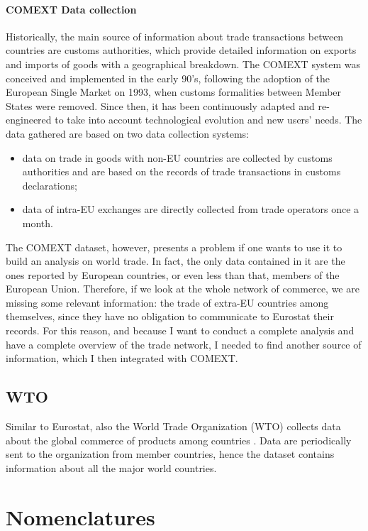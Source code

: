 \paragraph{COMEXT Data collection}
Historically, the main source of information about trade transactions between countries are customs authorities, which provide detailed information on exports and imports of goods with a geographical breakdown.
The COMEXT system was conceived and implemented in the early 90's,  following the adoption of the European Single Market on 1993, when customs formalities between Member States were removed. Since then, it has been continuously adapted and re-engineered to take into account technological evolution and new users' needs. The data gathered are based on two data collection systems:
\begin{itemize}
    \item data on trade in goods with non-EU countries are collected by customs authorities and are based on the records of trade transactions in customs declarations;
    \item data of intra-EU exchanges are directly collected from trade operators once a month.
\end{itemize}


The COMEXT dataset, however, presents a problem if one wants to use it to build an analysis on world trade. In fact, the only data contained in it are the ones reported by European countries, or even less than that, members of the European Union. Therefore, if we look at the whole network of commerce, we are missing some relevant information: the trade of extra-EU countries among themselves, since they have no obligation to communicate to Eurostat their records.
For this reason, and because I want to conduct a complete analysis and have a complete overview of the trade network, I needed to find another source of information, which I then integrated with COMEXT.

\subsection{WTO}
Similar to Eurostat, also the World Trade Organization (WTO) collects data about the global commerce of products among countries \cite{wto2022stats}. Data are periodically sent to the organization from member countries, hence the dataset contains information about all the major world countries. 


\section{Nomenclatures}

